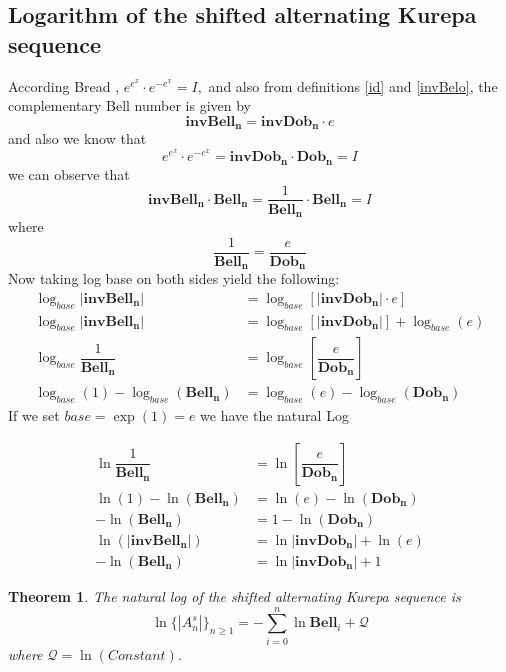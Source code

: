 \documentclass[pdflatex,sn-mathphys-num]{sn-jnl}%
\newtheorem{theorem}{Theorem}
\theoremstyle{thmstyleone}%
\theoremstyle{thmstyletwo}%
\theoremstyle{thmstylethree}%
\begin{document}
\subsection{Logarithm of the shifted alternating Kurepa sequence}
According Bread \cite{beard1950coefficients}, $e^{e^x} \cdotp e^{-e^x}=I,$ and also from definitions \ref{id} and \ref{invBelo}, the complementary Bell number is given by 
$$\mathbf{invBell_n}=\mathbf{invDob_n}\cdotp{e} $$ and also we know that
$$e^{e^x} \cdotp e^{-e^x} = \mathbf{invDob_n}\cdotp\mathbf{Dob_n}=I$$ 
we can observe that $$\mathbf{invBell_n}\cdotp\mathbf{Bell_n}=\dfrac{1}{\mathbf{Bell_n}} \cdotp \mathbf{Bell_n}=I$$ 
where 
$$\dfrac{1}{\mathbf{Bell_n}}=\dfrac{e}{\mathbf{Dob_n}}$$
Now taking log base on both sides yield the following:
\begin{align}
\log_{base}\mathbf{|invBell_n|}&= \log_{base}\left[\mathbf{|invDob_n|}\cdotp e\right]\\ \nonumber
\log_{base}\mathbf{|invBell_n|}&= \log_{base}\left[\mathbf{|invDob_n|}\right] + \log_{base}(e)\\ \nonumber
    \log_{base}\dfrac{1}{\mathbf{Bell_n}}&= \log_{base}\left[\dfrac{e}{\mathbf{Dob_n}}\right]\\ \nonumber
   \log_{base}(1)-\log_{base}(\mathbf{Bell_n}) &=\log_{base}(e)-\log_{base}(\mathbf{Dob_n})
\end{align}
If we set $base=\exp{(1)}=e$ we have the natural Log \cite{beard1950coefficients}

\begin{align}\label{intropy}
    \ln\dfrac{1}{\mathbf{Bell_n}}&= \ln\left[\dfrac{e}{\mathbf{Dob_n}}\right]\\ \nonumber
   \ln(1)-\ln(\mathbf{Bell_n}) &=\ln(e)-\ln(\mathbf{Dob_n})\\ \nonumber
   -\ln(\mathbf{Bell_n}) &=1-\ln(\mathbf{Dob_n})\\\nonumber 
  \ln(\mathbf{|invBell_n|}) &=\ln\mathbf{|invDob_n|} + \ln(e) \\\nonumber
   -\ln(\mathbf{Bell_n}) &=\ln|\mathbf{invDob_n}| + 1 
\end{align}

\begin{theorem}
The natural log of the shifted alternating Kurepa sequence is
$$\ln\lbrace |A_n^s|\rbrace_{n\geq 1}=-\sum_{i=0}^{n}\ln\mathbf{Bell}_i +\mathcal{Q}$$
where $\mathcal{Q}=\ln(Constant).$

\end{theorem}
\end{document}
